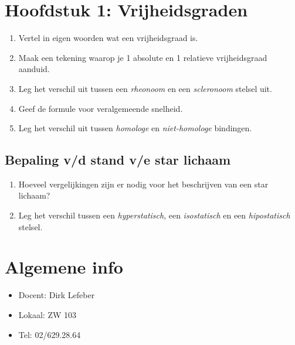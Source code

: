 \documentclass[12pt]{article}
\begin{document}
    \maketitle

	\section{Hoofdstuk 1: Vrijheidsgraden}%
	\label{sec:Hoofdstuk_1}
	\begin{enumerate}
		\item Vertel in eigen woorden wat een vrijheidsgraad is.
		\item Maak een tekening waarop je 1 absolute en 1 relatieve vrijheidsgraad aanduid.
		\item Leg het verschil uit tussen een \emph{rheonoom} en een \emph{scleronoom} stelsel uit.
		\item Geef de formule voor veralgemeende snelheid.
		\item Leg het verschil uit tussen \emph{homologe} en \emph{niet-homologe} bindingen.
	\end{enumerate}

	\subsection{Bepaling v/d stand v/e star lichaam}%
	\label{sub:Bepaling_v/d_stand_v/e_star_lichaam}
	\begin{enumerate}
		\item Hoeveel vergelijkingen zijn er nodig voor het beschrijven van een star lichaam?
		\item Leg het verschil tussen een \emph{hyperstatisch}, een \emph{isostatisch} en een \emph{hipostatisch} stelsel.
	\end{enumerate}
	

    \section{Algemene info}%
    \label{sec:Algemene_info}
    \begin{itemize}
    	\item Docent: Dirk Lefeber
		\item Lokaal: ZW 103
		\item Tel: 02/629.28.64
    \end{itemize}
\end{document}
